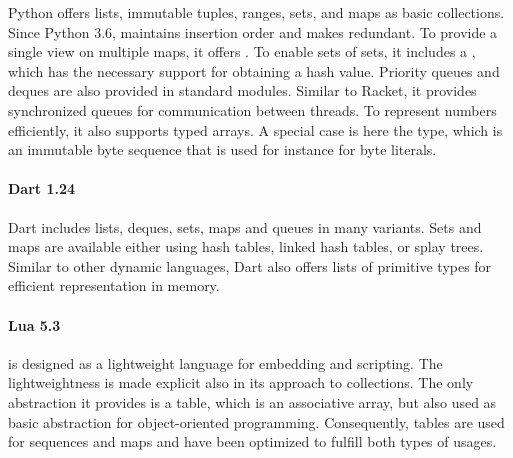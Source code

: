 \documentclass[sigconf, 10pt]{acmart}
\begin{document}

Python offers lists,
immutable tuples, ranges,
sets, and maps as basic collections.
Since Python 3.6,  maintains insertion order and
makes  redundant.
To provide a single view on multiple maps,
it offers .
To enable sets of sets, it includes a ,
which has the necessary support for obtaining a hash value.
Priority queues and deques are also provided in standard modules.
Similar to Racket,
it provides synchronized queues
for communication between threads.
To represent numbers efficiently, it also supports typed arrays.
A special case is here the  type,
which is an immutable byte sequence that is used for instance for byte literals.

\paragraph{Dart 1.24}

Dart includes lists, deques, sets, maps and queues in many variants.
Sets and maps are available either using hash tables,
linked hash tables, or splay trees.
Similar to other dynamic languages,
Dart also offers lists of primitive types
for efficient representation in memory.



\paragraph{Lua 5.3}
\label{sec:lua53}

is designed as a lightweight language for embedding and scripting.
The lightweightness is made explicit also in its approach to collections.
The only abstraction it provides is a table, which is an associative array,
but also used as basic abstraction for object-oriented programming.
Consequently, tables are used for sequences and maps
and have been optimized
to fulfill both types of usages\citep{The_implementation_of_lua}.
\end{document}
